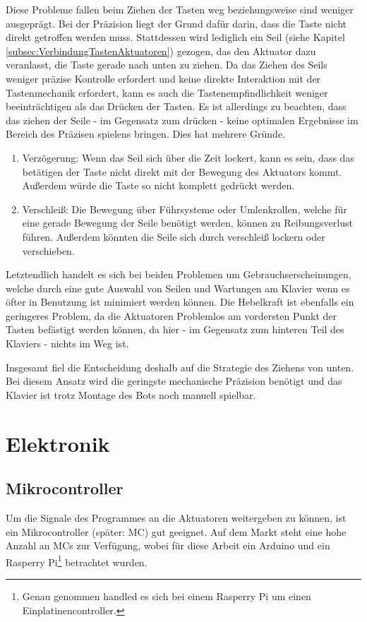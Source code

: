 Diese Probleme fallen beim Ziehen der Tasten weg beziehungsweise sind weniger ausgeprägt. %
Bei der Präzision liegt der Grund dafür darin, dass die Taste nicht
direkt getroffen werden muss. Stattdessen wird lediglich ein Seil (siehe Kapitel \ref{subsec:VerbindungTastenAktuatoren})
gezogen, das den Aktuator dazu veranlasst, die Taste
gerade nach unten zu ziehen.
Da das Ziehen des Seils weniger präzise Kontrolle erfordert
und keine direkte Interaktion mit der Tastenmechanik erfordert, kann es auch die Tastenempfindlichkeit weniger beeinträchtigen
als das Drücken der Tasten. Es ist allerdings zu beachten, dass das ziehen der Seile - im Gegensatz zum drücken - keine
optimalen Ergebnisse im Bereich des Präzisen spielens bringen. Dies hat mehrere Gründe.
\begin{enumerate}
	\item Verzögerung: Wenn das Seil sich über die Zeit lockert, kann es sein, dass das betätigen der Taste nicht direkt mit der Bewegung des Aktuators kommt. Außerdem würde die Taste so nicht komplett gedrückt werden.
	\item Verschleiß: Die Bewegung über Führsysteme oder Umlenkrollen, welche für eine gerade Bewegung der Seile benötigt werden, können zu Reibungsverlust führen. Außerdem könnten die Seile sich durch verschleiß lockern oder verschieben.
\end{enumerate}
Letztendlich handelt es sich bei beiden Problemen um Gebrauchserscheinungen, welche durch eine gute Auswahl von Seilen
und Wartungen am Klavier wenn es öfter in Benutzung ist minimiert werden können.
Die Hebelkraft ist ebenfalls ein geringeres Problem, da die Aktuatoren Problemlos am vordersten Punkt der Tasten
befästigt werden können, da hier - im Gegensatz zum hinteren Teil des Klaviers - nichts im Weg ist.

Insgesamt fiel die Entscheidung deshalb auf die Strategie des Ziehens von unten.
Bei diesem Ansatz wird die geringste mechanische Präzision benötigt und das Klavier ist trotz Montage des Bots noch manuell spielbar.

\section{Elektronik}\label{sec:konzeptionhw-elektronik}

\subsection{Mikrocontroller}\label{Ansteuerung}
Um die Signale des Programmes an die Aktuatoren weitergeben zu können, ist ein Mikrocontroller (später: \ac{MC}) gut geeignet.
Auf dem Markt steht eine hohe Anzahl an \ac{MC}s zur Verfügung,
wobei für diese Arbeit ein Arduino und ein Rasperry Pi\footnote{Genau genommen handled es sich bei einem Rasperry Pi um einen Einplatinencontroller.} betrachtet wurden.


